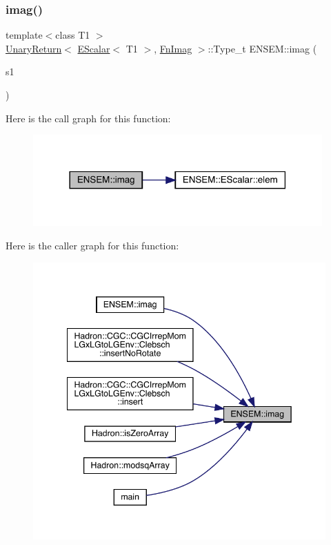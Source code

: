 \subsubsection{\texorpdfstring{imag()}{imag()}}
{\footnotesize\ttfamily template$<$class T1 $>$ \\
\mbox{\hyperlink{structENSEM_1_1UnaryReturn}{Unary\+Return}}$<$ \mbox{\hyperlink{classENSEM_1_1EScalar}{E\+Scalar}}$<$ T1 $>$, \mbox{\hyperlink{structENSEM_1_1FnImag}{Fn\+Imag}} $>$\+::Type\+\_\+t E\+N\+S\+E\+M\+::imag (\begin{DoxyParamCaption}\item[{const \mbox{\hyperlink{classENSEM_1_1EScalar}{E\+Scalar}}$<$ T1 $>$ \&}]{s1 }\end{DoxyParamCaption})\hspace{0.3cm}{\ttfamily [inline]}}

Here is the call graph for this function\+:
\nopagebreak
\begin{figure}[H]
\begin{center}
\leavevmode
\includegraphics[width=314pt]{d4/dca/group__escalar_ga415448f22c6dabfd82cbb0154e054c2e_cgraph}
\end{center}
\end{figure}
Here is the caller graph for this function\+:
\nopagebreak
\begin{figure}[H]
\begin{center}
\leavevmode
\includegraphics[width=342pt]{d4/dca/group__escalar_ga415448f22c6dabfd82cbb0154e054c2e_icgraph}
\end{center}
\end{figure}
\mbox{\label{group__escalar_ga70fcd41007f852c6b90539df7b80af87}} 
